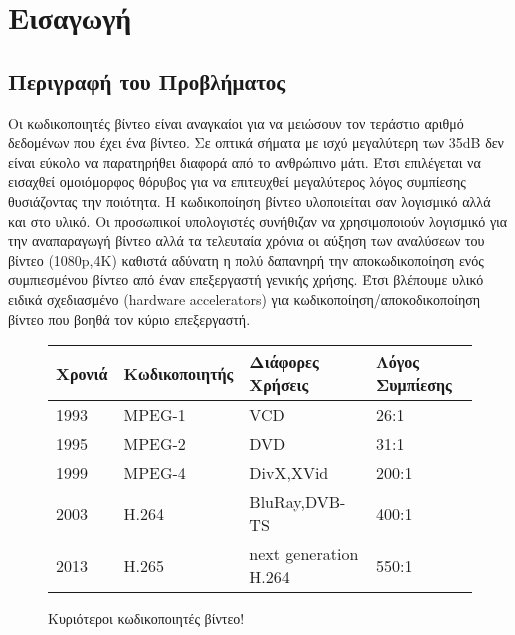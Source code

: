 ﻿\chapter{Εισαγωγή}
\label{chapter:chap1}

\section{Περιγραφή του Προβλήματος}
\label{section:sect11}
\indent
Οι κωδικοποιητές βίντεο είναι αναγκαίοι για να μειώσουν τον τεράστιο αριθμό δεδομένων που έχει ένα βίντεο. Σε οπτικά σήματα με ισχύ μεγαλύτερη των \si{35}{dB} δεν είναι εύκολο να παρατηρήθει διαφορά από το ανθρώπινο μάτι. Έτσι επιλέγεται να εισαχθεί ομοιόμορφος θόρυβος για να επιτευχθεί μεγαλύτερος λόγος συμπίεσης θυσιάζοντας την ποιότητα.
Η κωδικοποίηση βίντεο υλοποιείται σαν λογισμικό αλλά και στο υλικό. Οι προσωπικοί υπολογιστές συνήθιζαν να χρησιμοποιούν λογισμικό για την αναπαραγωγή βίντεο αλλά τα τελευταία χρόνια οι αύξηση των αναλύσεων του βίντεο (1080p,4K) καθιστά αδύνατη η πολύ δαπανηρή την αποκωδικοποίηση ενός συμπιεσμένου βίντεο από έναν επεξεργαστή γενικής χρήσης. Έτσι βλέπουμε υλικό ειδικά σχεδιασμένο (hardware accelerators) για κωδικοποίηση/αποκοδικοποίηση βίντεο που βοηθά τον κύριο επεξεργαστή.

\begin{figure}[h!]
    \begin{center}
        \begin{tabular}{| l | l | l | l |}
        \hline
        Χρονιά  & Κωδικοποιητής & Διάφορες Χρήσεις      & Λόγος Συμπίεσης           \\ \hline
        1993    & MPEG-1        &       VCD             &       26:1                \\ \hline
        1995    & MPEG-2        &       DVD             &       31:1                \\ \hline
        1999    & MPEG-4        &    DivX,XVid          &      200:1                \\ \hline
        2003    & H.264         & BluRay,DVB-TS         &      400:1                \\ \hline
        2013    & H.265         & next generation H.264 &      550:1                \\ \hline
        \hline
        \end{tabular}
    \end{center}

    \caption{Κυριότεροι κωδικοποιητές βίντεο!}
    \label{fig:listofcodecs}
\end{figure}

